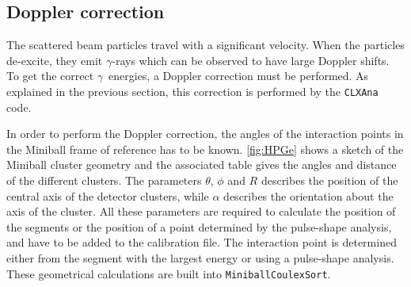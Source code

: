 \documentclass[twoside,english]{uiofysmaster/uiofysmaster}
\newcommand{\ga}{$\gamma$}
\let\orgautoref\autoref
\renewcommand{\autoref}
        {%
		 \def\sectionautorefname{Section}%
		 \def\subsectionautorefname{Section}%
		 \def\subsubsectionautorefname{Section}%
		 \def\chapterautorefname{Chapter}%
          \orgautoref}
\begin{document}


\subsection{Doppler correction}\label{ssec:Doppler}
The scattered beam particles travel with a significant velocity.
When the particles de-excite, they emit \ga-rays which can be observed to have large Doppler shifts.
To get the correct \ga\ energies, a Doppler correction must be performed.
As explained in the previous section, this correction is performed by the \texttt{CLXAna} code. 

In order to perform the Doppler correction, the angles of the interaction points in the Miniball frame of reference has to be known. 
\autoref{fig:HPGe} shows a sketch of the Miniball cluster geometry and the associated table gives the angles and distance of the different clusters.
The parameters $\theta$, $\phi$ and $R$ describes the position of the central axis of the detector clusters, while $\alpha$ describes the orientation about the axis of the cluster. 
All these parameters are required to calculate the position of the segments or the position of a point determined by the pulse-shape analysis, and have to be added to the calibration file. 
The interaction point is determined either from the segment with the largest energy or using a pulse-shape analysis. 
These geometrical calculations are built into \texttt{MiniballCoulexSort}.
\end{document}
